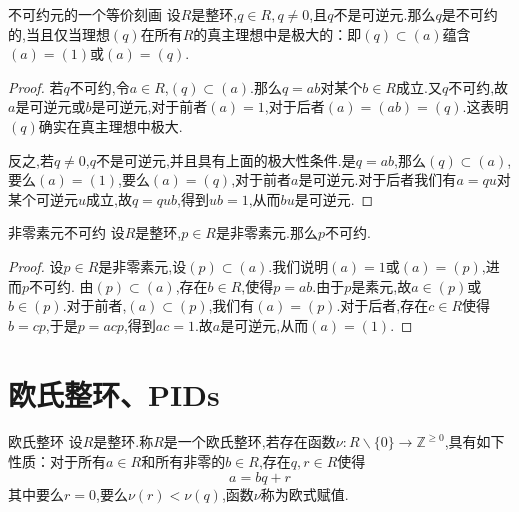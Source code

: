 \documentclass[lang=cn,12pt,color=green,fontset=none,pad]{elegantbook}
\begin{document}
\begin{theorem}{不可约元的一个等价刻画}
    设$R$是整环,$q \in R,q \neq 0$,且$q$不是可逆元.那么$q$是不可约的,当且仅当理想$\left( q \right)$在所有$R$的真主理想中是极大的：即$\left( q \right)\subset \left( a \right)$蕴含$\left( a \right)=\left( 1 \right)$或$\left( a \right)=\left( q \right)$.
\end{theorem}

\begin{proof}
    若$q$不可约,令$a \in R$,$\left( q \right)\subset \left( a \right)$.那么$q=ab$对某个$b \in R$成立.又$q$不可约,故$a$是可逆元或$b$是可逆元,对于前者$\left( a \right)=1$,对于后者$\left( a \right)=\left( ab \right)=\left( q \right)$.这表明$\left( q \right)$确实在真主理想中极大.

反之,若$q \neq 0$,$q$不是可逆元,并且具有上面的极大性条件.是$q=ab$,那么$\left( q \right)\subset \left( a \right)$,要么$\left( a \right)=\left( 1 \right)$,要么$\left( a \right)=\left( q \right)$,对于前者$a$是可逆元.对于后者我们有$a= qu$对某个可逆元$u$成立,故$q= q u b$,得到$u b=1$,从而$bu$是可逆元.
\end{proof}

\begin{proposition}{非零素元不可约}
    设$R$是整环,$p \in R$是非零素元.那么$p$不可约.
\end{proposition}
\begin{proof}
    设$p \in R$是非零素元,设$\left( p \right)\subset \left( a \right)$.我们说明$\left( a \right)=1$或$\left( a \right)=\left( p \right)$,进而$p$不可约.
由$\left( p \right)\subset \left( a \right)$,存在$b \in R$,使得$p=ab$.由于$p$是素元,故$a \in \left( p \right)$或$b \in \left( p \right)$.对于前者,$\left( a \right)\subset \left( p \right)$,我们有$\left( a \right)=\left( p \right)$.对于后者,存在$c \in R$使得$b = cp$,于是$p = acp$,得到$ac=1$.故$a$是可逆元,从而$\left( a \right)=\left( 1 \right)$.
\end{proof}


\section{欧氏整环、PIDs}

\begin{definition}{欧氏整环}\label{def:Euclidean domain}
    设$R$是整环.称$R$是一个欧氏整环,若存在函数$\nu:R\backslash \{ 0 \}\to \mathbb{Z}^{\geqslant 0}$,具有如下性质：对于所有$a \in R$和所有非零的$b \in R$,存在$q,r \in R$使得 $$ a = bq+r $$其中要么$r=0$,要么$\nu \left( r \right)< \nu \left( q \right)$,函数$\nu$称为欧式赋值.
\end{definition}
\end{document}
